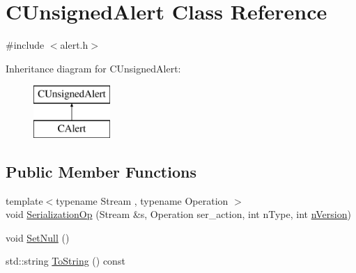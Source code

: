 \hypertarget{class_c_unsigned_alert}{}\section{C\+Unsigned\+Alert Class Reference}
\label{class_c_unsigned_alert}


{\ttfamily \#include $<$alert.\+h$>$}

Inheritance diagram for C\+Unsigned\+Alert\+:\begin{figure}[H]
\begin{center}
\leavevmode
\includegraphics[height=2.000000cm]{class_c_unsigned_alert}
\end{center}
\end{figure}
\subsection*{Public Member Functions}
\begin{DoxyCompactItemize}
\item 
{\footnotesize template$<$typename Stream , typename Operation $>$ }\\void \hyperlink{class_c_unsigned_alert_acdf81abb731f9fc8d2c04618f2f4d79d}{Serialization\+Op} (Stream \&s, Operation ser\+\_\+action, int n\+Type, int \hyperlink{class_c_unsigned_alert_ad8fad8e8f62caaf8162fad19170de2cf}{n\+Version})
\item 
void \hyperlink{class_c_unsigned_alert_a9d387307eb60095e50134d10eea3ad69}{Set\+Null} ()
\item 
std\+::string \hyperlink{class_c_unsigned_alert_a326fbf3fae6b9ac2b7043350570b770f}{To\+String} () const 
\end{DoxyCompactItemize}

